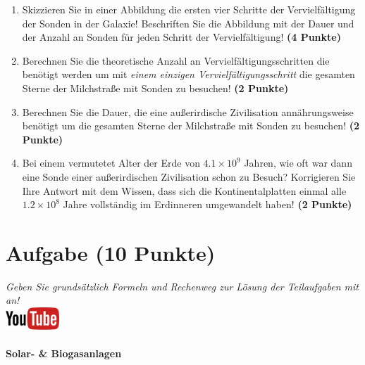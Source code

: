 \documentclass[a4paper, 9pt]{scrartcl}\usepackage[]{graphicx}\usepackage[]{xcolor}
\begin{document}
\begin{enumerate}
\item Skizzieren Sie in einer Abbildung die ersten vier Schritte der
  Vervielf{\"a}ltigung der Sonden in der Galaxie! Beschriften Sie die Abbildung
  mit der Dauer und der Anzahl an Sonden f{\"u}r jeden Schritt der Vervielf{\"a}ltigung! \textbf{(4 Punkte)}
\item Berechnen Sie die theoretische Anzahl an Vervielf{\"a}ltigungsschritten die
  ben{\"o}tigt werden um mit \textit{einem einzigen Vervielf{\"a}ltigungsschritt} die
  gesamten Sterne der Milchstra{\ss}e mit Sonden zu besuchen! \textbf{(2 Punkte)}
\item Berechnen Sie die Dauer, die eine au{\ss}erirdische Zivilisation
  ann{\"a}hrungsweise ben{\"o}tigt um die gesamten Sterne der Milchstra{\ss}e mit
  Sonden zu besuchen! \textbf{(2 Punkte)}
\item Bei einem vermutetet Alter der Erde von $\ensuremath{4.1\times 10^{9}}$ Jahren,
  wie oft war dann eine Sonde einer au{\ss}erirdischen Zivilisation schon zu
  Besuch? Korrigieren Sie Ihre Antwort mit dem Wissen, dass sich die
  Kontinentalplatten einmal alle $\ensuremath{1.2\times 10^{8}}$ Jahre vollst{\"a}ndig im
  Erdinneren umgewandelt haben! \textbf{(2 Punkte)}
\end{enumerate}


 
\clearpage

\section{Aufgabe \hfill (10 Punkte)}

\textit{Geben Sie grunds{\"a}tzlich Formeln und Rechenweg zur L{\"o}sung der
  Teilaufgaben mit an!} \\[1Ex]

\hfill\href{https://youtu.be/aBxLkdF-c4M}{\includegraphics[width =
  2cm]{img/youtube}} %
\hspace{2Ex}

\paragraph{Solar- \& Biogasanlagen}
\end{document}

